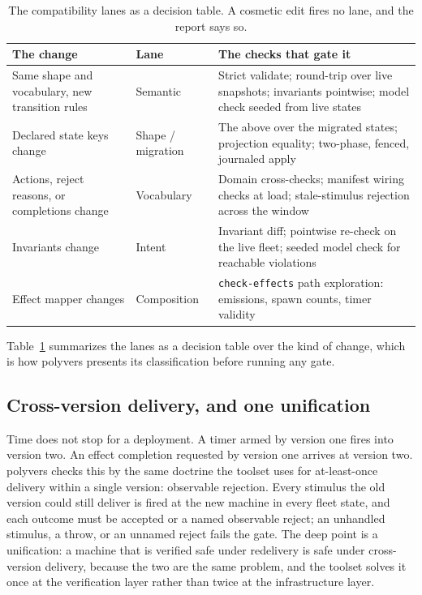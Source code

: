 \documentclass[11pt]{article}
\newcommand{\tool}[1]{\textsf{#1}}
\newcommand{\code}[1]{\texttt{#1}}
\begin{document}
\begin{table}[t]
\centering
\small
\begin{tabular}{@{}p{4.4cm}p{2.3cm}p{6.2cm}@{}}
\toprule
\textbf{The change} & \textbf{Lane} & \textbf{The checks that gate it} \\
\midrule
Same shape and vocabulary, new transition rules &
Semantic &
Strict validate; round-trip over live snapshots; invariants pointwise; model
check seeded from live states \\[0.4em]
Declared state keys change &
Shape / migration &
The above over the migrated states; projection equality; two-phase, fenced,
journaled apply \\[0.4em]
Actions, reject reasons, or completions change &
Vocabulary &
Domain cross-checks; manifest wiring checks at load; stale-stimulus rejection
across the window \\[0.4em]
Invariants change &
Intent &
Invariant diff; pointwise re-check on the live fleet; seeded model check for
reachable violations \\[0.4em]
Effect mapper changes &
Composition &
\code{check-effects} path exploration: emissions, spawn counts, timer validity \\
\bottomrule
\end{tabular}
\caption{The compatibility lanes as a decision table. A cosmetic edit fires no
lane, and the report says so.}
\label{tab:lanes}
\end{table}

Table~\ref{tab:lanes} summarizes the lanes as a decision table over the kind of
change, which is how \tool{polyvers} presents its classification before running
any gate.

\subsection{Cross-version delivery, and one unification}

Time does not stop for a deployment. A timer armed by version one fires into
version two. An effect completion requested by version one arrives at version
two. \tool{polyvers} checks this by the same doctrine the toolset uses for
at-least-once delivery within a single version: observable rejection. Every
stimulus the old version could still deliver is fired at the new machine in
every fleet state, and each outcome must be accepted or a named observable
reject; an unhandled stimulus, a throw, or an unnamed reject fails the gate. The
deep point is a unification: a machine that is verified safe under redelivery is
safe under cross-version delivery, because the two are the same problem, and the
toolset solves it once at the verification layer rather than twice at the
infrastructure layer.
\end{document}

